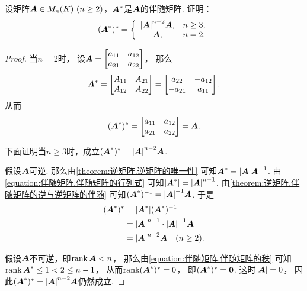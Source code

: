 \begin{example}
设矩阵\(\vb{A} \in M_n(K)\ (n\geq2)\)，\(\boldsymbol{A}^*\)是\(\boldsymbol{A}\)的伴随矩阵.
证明：\begin{equation}\label{equation:伴随矩阵.伴随矩阵的伴随}
	(\boldsymbol{A}^*)^* = \left\{ \begin{array}{cl}
		\abs{\boldsymbol{A}}^{n-2} \boldsymbol{A}, & n\geq3, \\
		\boldsymbol{A}, & n=2.
	\end{array} \right.
\end{equation}
\begin{proof}
当\(n=2\)时，
设\(\boldsymbol{A} = \begin{bmatrix}
	a_{11} & a_{12} \\
	a_{21} & a_{22}
\end{bmatrix}\)，
那么\[
	\boldsymbol{A}^* = \begin{bmatrix}
		A_{11} & A_{21} \\
		A_{12} & A_{22}
	\end{bmatrix}
	= \begin{bmatrix}
		a_{22} & - a_{12} \\
		- a_{21} & a_{11}
	\end{bmatrix}.
\]
从而\[
	(\boldsymbol{A}^*)^* = \begin{bmatrix}
		a_{11} & a_{12} \\
		a_{21} & a_{22}
	\end{bmatrix}
	= \boldsymbol{A}.
\]

下面证明当\(n\geq3\)时，成立\((\boldsymbol{A}^*)^* = \abs{\boldsymbol{A}}^{n-2} \boldsymbol{A}\).

假设\(\boldsymbol{A}\)可逆.
那么由\cref{theorem:逆矩阵.逆矩阵的唯一性}
可知\(\boldsymbol{A}^* = \abs{\boldsymbol{A}} \boldsymbol{A}^{-1}\).
由\cref{equation:伴随矩阵.伴随矩阵的行列式}
可知\(\abs{\boldsymbol{A}^*} = \abs{\boldsymbol{A}}^{n-1}\).
由\cref{theorem:逆矩阵.伴随矩阵的逆与逆矩阵的伴随}
可知\((\boldsymbol{A}^*)^{-1} = \abs{\boldsymbol{A}}^{-1} \boldsymbol{A}\).
于是\begin{align*}
	(\boldsymbol{A}^*)^*
	&= \abs{\boldsymbol{A}^*} (\boldsymbol{A}^*)^{-1} \\
	&= \abs{\boldsymbol{A}}^{n-1} \cdot \abs{\boldsymbol{A}}^{-1} \boldsymbol{A} \\
	&= \abs{\boldsymbol{A}}^{n-2} \boldsymbol{A}
	\quad(n\geq2).
\end{align*}

假设\(\boldsymbol{A}\)不可逆，即\(\rank\boldsymbol{A}<n\)，
那么由\cref{equation:伴随矩阵.伴随矩阵的秩}
可知\(\rank\boldsymbol{A}^* \leq 1 < 2 \leq n-1\)，
从而\(\rank(\boldsymbol{A}^*)^* = 0\)，
即\((\boldsymbol{A}^*)^* = \boldsymbol0\).
这时\(\abs{\boldsymbol{A}}=0\)，
因此\((\boldsymbol{A}^*)^* = \abs{\boldsymbol{A}}^{n-2} \boldsymbol{A}\)仍然成立.
\end{proof}
\end{example}

